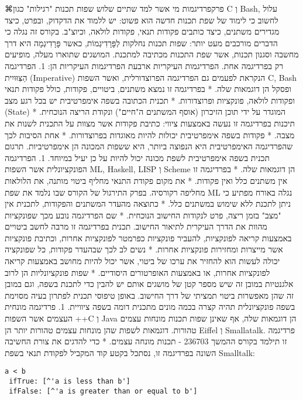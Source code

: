 ⌘פרק{פרדיגמות}
מי אשר למד שתיים שלוש שפות תכנות "רגילות" כגון C וְ Bash, עלול לחשוב כי לימוד של שפת תכנות חדשה הוא פשוט: יש ללמוד את הדקדוק, ובפרט, כיצד מגדירים משתנים, כיצד כותבים פקודות תנאי, פקודות לולאה, וכיוצ"ב.
בקורס זה נגלה כי הדברים מורכבים מעט יותר: שפות תכנות נחלקות לְפָּרָדִיגְמוֹת, כאשר פָּרָדִיגְמָה היא דרך מחשבה וסגנון תכנות, אשר שפת התכנות מכתיבה למתכנת. המושגים שתוארו מעלה, מופיעים רק בפרדיגמה אחת.
הפרדיגמות העיקריות
ארבעת הפרדיגמות העיקריות הן:
1. הפרדיגמה הַצִּוּוּיִית (Imperative) הנקראת לפעמים גם הפרדיגמה הפרוצדורלית, ואשר השפות C, Bash ופסקל הן דוגמאות שלה.
* בפרדיגמה זו נמצא משתנים, ביטויים, פקודות, כולל פקודות תנאי ופקודות לולאה, פונקציות ופרוצדורות.
* תכנית הכתובה בשפה אימפרטיבית יש בכל רגע מצב (State) המוגדר על ידי תוכן הזיכרון (אוסף המשתנים ה"חיים") ונקודת הריצה הנוכחית.
* תיכנות בפרדיגמה זו נעשה באמצעות ציווי: כתיבת פקודות אשר מצוות על התכנית לשנות את מצבה.
* פקודות בשפה אימפרטיבית יכולות להיות מאוגדות בפרוצדורות.
* אחת הסיבות לכך שהפרדיגמה האימפרטיבית היא הנפוצה ביותר, היא ששפות המכונה הן אימפרטיביות. תרגום תכנית בשפה אימפרטיבית לשפת מכונה יכול להיות על כן יעיל במיוחד.
1. הפרדיגמה הפונקציונלית אשר השפות ML, Haskell, LISP וְ Scheme הן דוגמאות שלה.
* בפרדיגמה זו אין משתנים כלל ואין פקודות.
* את מקום פקודת התנאי מחליף ביטוי מותנה, את הלולאות מחליפה רקורסיה. בפרק התירגול של הקורס שבו נלמד את שפת ML נגלה באורח מפתיע כי ניתן לתכנת ללא שימוש במשתנים כלל.
* כתוצאה מהעדר המשתנים והפקודות, לתכנית אין "מצב" בזמן ריצה, פרט לנקודות החישוב הנוכחית.
* שם הפרדיגמה נובע מכך שפונקציות מהוות את הדרך העיקרית לתיאור החישוב. תכנית בפרדיגמה זו מרבה לחשב ביטויים באמצעות קריאה לפונקציות, להעביר פונקציות כפרמטר לפונקציות אחרות, וכתיבת פונקציות אשר מייצרות ומחזירות פונקציות אחרות.
* נשים לב לכך שבהעדר פקודות, כל שפונקציה יכולה לעשות הוא להחזיר את ערכו של ביטוי, אשר יכול להיות מחושב באמצעות קריאה לפונקציות אחרות, או באמצעות האופרטורים היסודיים.
* שפות פונקציונליות הן לרוב אלגנטיות במובן זה שיש מספר קטן של מושגים אותם יש להבין כדי לתכנת בשפה, וגם במובן זה שהן מאפשרות ביטוי תמציתי של דרך החישוב. באופן טיפוסי תכנית לפתרון בעיה מסוימת בשפה פונקציונלית תהיה קצרה בכמה מונים מתכנית דומה בשפה ציוויית.
1. פרדיגמה מונחית העצמים אשר השפות ++C וְ Java הן דוגמאות שלה, אף שאינן שפות תכנות מונחות עצמים טהורות. דוגמאות לשפות שהן מונחות עצמים טהורות יותר הן Eiffel וְ Smallatalk. פרדיגמה זו תילמד בקורס ההמשך 236703 - תכנות מונחה עצמים.
* כדי להדגים את צורת החשיבה השונה בפרדיגמה זו, נסתכל בקטע קוד המקביל לפקודת תנאי בשפת Smalltalk:

\begin{verbatim}
a < b
 ifTrue: [^'a is less than b']
 ifFalse: [^'a is greater than or equal to b']
\end{verbatim}

